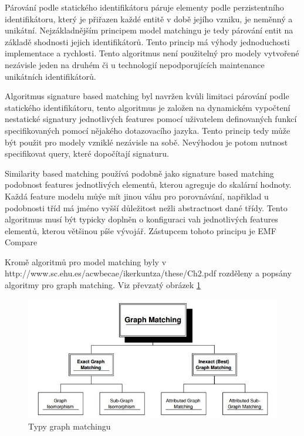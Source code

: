 \documentclass[11pt,twoside,a4paper]{book}
\begin{document}
 Párování podle statického identifikátoru páruje elementy podle perzistentního
 identifikátoru, který je přiřazen každé entitě v době jejího vzniku, je
 neměnný a unikátní. Nejzákladnějším principem model matchingu je tedy párování
 entit na základě shodnosti jejich identifikátorů. Tento princip má výhody
 jednoduchosti implementace a rychlosti. Tento algoritmus není použitelný pro
 modely vytvořené nezávisle jeden na druhém či u technologií nepodporujících
 maintenance unikátních identifikátorů.
 
 Algoritmus signature based matching byl navržen kvůli limitaci párování podle
 statického identifikátoru, tento algoritmus je založen na dynamickém vypočtení
 nestatické signatury jednotlivých features pomocí uživatelem definovaných
 funkcí specifikovaných pomocí nějakého dotazovacího jazyka. Tento princip tedy
 může být použit pro modely vzniklé nezávisle na sobě. Nevýhodou je potom
 nutnost specifikovat query, které dopočítají signaturu.
 
 Similarity based matching používá podobně jako signature based matching
 podobnost features jednotlivých elementů, kterou agreguje do skalární hodnoty.
 Každá feature modelu můýe mít jinou váhu pro porovnávání, napřiklad u
 podobnosti tříd má jméno vyšší důležitost nežli abstractnost dané třídy.
 Tento algoritmus musí být typicky doplněn o konfiguraci vah jednotlivých
 features elementů, kterou většinou píše vývojář. Zástupcem tohoto principu je
 EMF Compare
 
 Kromě algoritmů pro model matching byly v http://www.sc.ehu.es/acwbecae/ikerkuntza/these/Ch2.pdf
 rozděleny a popsány algoritmy pro graph matching. Viz převzatý obrázek
 \ref{fig:graph_matching}
 
 \begin{figure}[ht]
\begin{center}
\includegraphics[width=15cm]{figures/graph_matching.jpg}
\caption{Typy graph matchingu}
\label{fig:graph_matching}
\end{center}
\end{figure}
 
\end{document}

